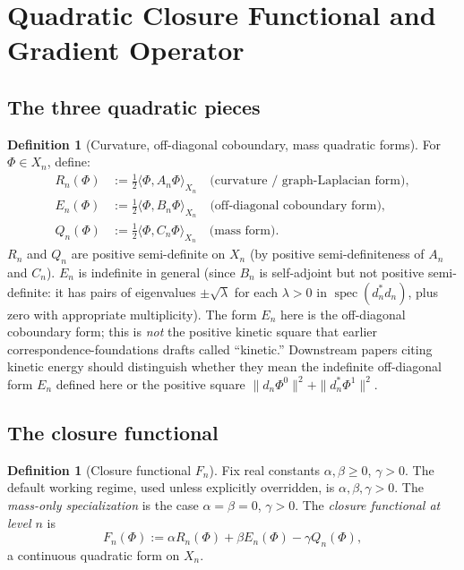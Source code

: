 \documentclass[11pt, a4paper]{amsart}
\theoremstyle{definition}
\newtheorem{definition}[theorem]{Definition}
\newcommand{\spec}{\operatorname{spec}}
\begin{document}
\section{Quadratic Closure Functional and Gradient Operator}
\label{sec:quadratic}

\subsection{The three quadratic pieces}

\begin{definition}[Curvature, off-diagonal coboundary, mass
quadratic forms]
\label{def:RnEnQn}
For $\Phi \in X_n$, define:
\begin{align*}
  R_n(\Phi) &:= \tfrac{1}{2} \langle \Phi, A_n \Phi \rangle_{X_n}
    \quad \text{(curvature / graph-Laplacian form)}, \\
  E_n(\Phi) &:= \tfrac{1}{2} \langle \Phi, B_n \Phi \rangle_{X_n}
    \quad \text{(off-diagonal coboundary form)}, \\
  Q_n(\Phi) &:= \tfrac{1}{2} \langle \Phi, C_n \Phi \rangle_{X_n}
    \quad \text{(mass form)}.
\end{align*}
$R_n$ and $Q_n$ are positive semi-definite on $X_n$ (by
positive semi-definiteness of $A_n$ and $C_n$). $E_n$ is
indefinite in general (since $B_n$ is self-adjoint but not
positive semi-definite: it has pairs of eigenvalues
$\pm\sqrt{\lambda}$ for each $\lambda > 0$ in
$\spec(d_n^* d_n)$, plus zero with appropriate multiplicity).
The form $E_n$ here is the off-diagonal coboundary form; this
is \emph{not} the positive kinetic square that earlier
correspondence-foundations drafts called ``kinetic.'' Downstream
papers citing kinetic energy should distinguish whether they
mean the indefinite off-diagonal form $E_n$ defined here or the
positive square $\|d_n \Phi^0\|^2 + \|d_n^* \Phi^1\|^2$.
\end{definition}

\subsection{The closure functional}

\begin{definition}[Closure functional $F_n$]
\label{def:Fn}
Fix real constants $\alpha, \beta \geq 0$, $\gamma > 0$. The
default working regime, used unless explicitly overridden, is
$\alpha, \beta, \gamma > 0$. The \emph{mass-only specialization}
is the case $\alpha = \beta = 0$, $\gamma > 0$. The
\emph{closure functional at level $n$} is
\[
  F_n(\Phi) := \alpha R_n(\Phi) + \beta E_n(\Phi) - \gamma Q_n(\Phi),
\]
a continuous quadratic form on $X_n$.
\end{definition}
\end{document}
